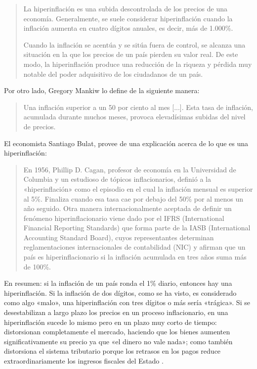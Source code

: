 \documentclass[12pt,a4paper,twoside]{book}
\begin{document}
\begin{quotation}
La hiperinflación es una subida descontrolada de los precios de una economía. Generalmente, se suele considerar hiperinflación cuando la inflación aumenta en cuatro dígitos anuales, es decir, más de 1.000\%. 

Cuando la inflación se acentúa y se sitúa fuera de control, se alcanza una situación en la que los precios de un país pierden su valor real. De este modo, la hiperinflación produce una reducción de la riqueza y pérdida muy notable del poder adquisitivo de los ciudadanos de un país. \cite{epedia:hiper}
\end{quotation}

Por otro lado, Gregory Mankiw lo define de la siguiente manera:

\begin{quotation}
Una inflación superior a un 50 por ciento al mes [...]. Esta tasa de inflación, acumulada durante muchos meses, provoca elevadísimas subidas del nivel de precios. \cite[pág. 199]{mankiw}
\end{quotation}

El economista Santiago Bulat, provee de una explicación acerca de lo que es una hiperinflación:

\begin{quotation}
En 1956, Phillip D. Cagan, profesor de economía en la Universidad de Columbia y un estudioso de tópicos inflacionarios, definió a la «hiperinflación» como el episodio en el cual la inflación mensual es superior al 5\%. Finaliza cuando esa tasa cae por debajo del 50\% por al menos un año seguido. Otra manera internacionalmente aceptada de definir un fenómeno hiperinflacionario viene dado por el IFRS (International Financial Reporting Standards) que forma parte de la IASB (International Accounting Standard Board), cuyos representantes determinan reglamentaciones internacionales de contabilidad (NIC) y afirman que un país es hiperinflacionario si la inflación acumulada en tres años suma más de 100\%. \cite{bulat:hiper}
\end{quotation}

En resumen: si la inflación de un país ronda el 1\% diario, entonces hay una hiperinflación. Si la inflación de dos dígitos, como se ha visto, es considerado como algo «malo», una hiperinflación con tres dígitos o más sería «trágica». Si se desestabilizan a largo plazo los precios en un proceso inflacionario, en una hiperinflación sucede lo mismo pero en un plazo muy corto de tiempo: distorsionan completamente el mercado, haciendo que los bienes aumenten significativamente su precio ya que «el dinero no vale nada»; como también distorsiona el sistema tributario	porque los retrasos en los pagos reduce extraordinariamente los ingresos fiscales del Estado \cite[pág. 200]{mankiw}.
\end{document}
